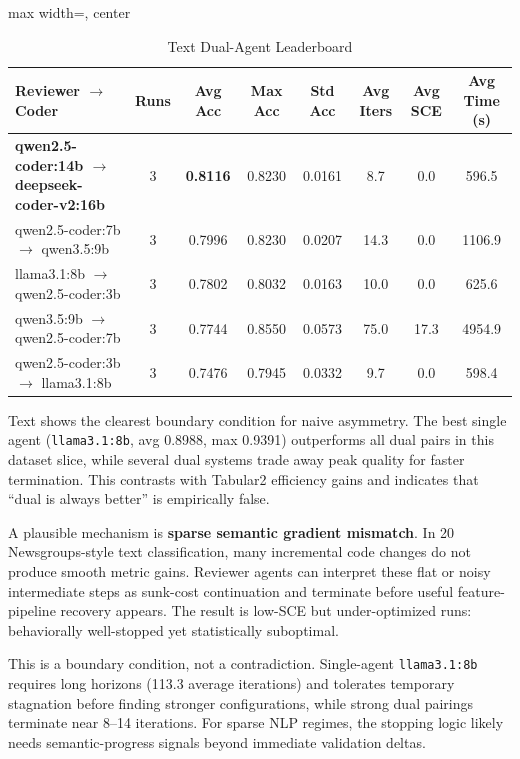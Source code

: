 \documentclass[11pt,a4paper]{article}
\begin{document}
\begin{table}[ht]
\centering
\footnotesize
\setlength{\tabcolsep}{3pt}
\caption{Text Dual-Agent Leaderboard}
\label{tab:text_dual}
\begin{adjustbox}{max width=\textwidth, center}
\begin{tabular}{>{\raggedright\arraybackslash}p{4.2cm}ccccccc}
\toprule
\textbf{Reviewer $\rightarrow$ Coder} & \textbf{Runs} & \textbf{Avg Acc} & \textbf{Max Acc} & \textbf{Std Acc} & \textbf{Avg Iters} & \textbf{Avg SCE} & \textbf{Avg Time (s)} \\
\midrule
\textbf{qwen2.5-coder:14b $\rightarrow$ deepseek-coder-v2:16b} & 3 & \textbf{0.8116} & 0.8230 & 0.0161 & 8.7 & 0.0 & 596.5 \\
qwen2.5-coder:7b $\rightarrow$ qwen3.5:9b & 3 & 0.7996 & 0.8230 & 0.0207 & 14.3 & 0.0 & 1106.9 \\
llama3.1:8b $\rightarrow$ qwen2.5-coder:3b & 3 & 0.7802 & 0.8032 & 0.0163 & 10.0 & 0.0 & 625.6 \\
qwen3.5:9b $\rightarrow$ qwen2.5-coder:7b & 3 & 0.7744 & 0.8550 & 0.0573 & 75.0 & 17.3 & 4954.9 \\
qwen2.5-coder:3b $\rightarrow$ llama3.1:8b & 3 & 0.7476 & 0.7945 & 0.0332 & 9.7 & 0.0 & 598.4 \\
\bottomrule
\end{tabular}
\end{adjustbox}
\end{table}

Text shows the clearest boundary condition for naive asymmetry. The best single agent (\texttt{llama3.1:8b}, avg 0.8988, max 0.9391) outperforms all dual pairs in this dataset slice, while several dual systems trade away peak quality for faster termination. This contrasts with Tabular2 efficiency gains and indicates that ``dual is always better'' is empirically false.

A plausible mechanism is \textbf{sparse semantic gradient mismatch}. In 20 Newsgroups-style text classification, many incremental code changes do not produce smooth metric gains. Reviewer agents can interpret these flat or noisy intermediate steps as sunk-cost continuation and terminate before useful feature-pipeline recovery appears. The result is low-SCE but under-optimized runs: behaviorally well-stopped yet statistically suboptimal.

This is a boundary condition, not a contradiction. Single-agent \texttt{llama3.1:8b} requires long horizons (113.3 average iterations) and tolerates temporary stagnation before finding stronger configurations, while strong dual pairings terminate near 8--14 iterations. For sparse NLP regimes, the stopping logic likely needs semantic-progress signals beyond immediate validation deltas.
\end{document}
